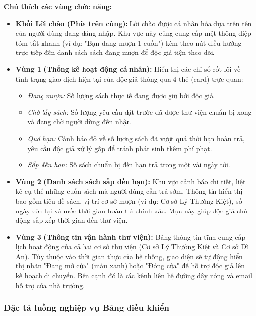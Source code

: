 \noindent\textbf{Chú thích các vùng chức năng:}
\begin{itemize}
    \item \textbf{Khối Lời chào (Phía trên cùng):} Lời chào được cá nhân hóa dựa trên tên của người dùng đang đăng nhập. Khu vực này cũng cung cấp một thông điệp tóm tắt nhanh (ví dụ: "Bạn đang mượn 1 cuốn") kèm theo nút điều hướng trực tiếp đến danh sách sách đang mượn để độc giả tiện theo dõi.
    
    \item \textbf{Vùng 1 (Thống kê hoạt động cá nhân):} Hiển thị các chỉ số cốt lõi về tình trạng giao dịch hiện tại của độc giả thông qua 4 thẻ (card) trực quan:
    \begin{itemize}
        \item \textit{Đang mượn:} Số lượng sách thực tế đang được giữ bởi độc giả.
        \item \textit{Chờ lấy sách:} Số lượng yêu cầu đặt trước đã được thư viện chuẩn bị xong và đang chờ người dùng đến nhận.
        \item \textit{Quá hạn:} Cảnh báo đỏ về số lượng sách đã vượt quá thời hạn hoàn trả, yêu cầu độc giả xử lý gấp để tránh phát sinh thêm phí phạt.
        \item \textit{Sắp đến hạn:} Số sách chuẩn bị đến hạn trả trong một vài ngày tới.
    \end{itemize}
    
    \item \textbf{Vùng 2 (Danh sách sách sắp đến hạn):} Khu vực cảnh báo chi tiết, liệt kê cụ thể những cuốn sách mà người dùng cần trả sớm. Thông tin hiển thị bao gồm tiêu đề sách, vị trí cơ sở mượn (ví dụ: Cơ sở Lý Thường Kiệt), số ngày còn lại và mốc thời gian hoàn trả chính xác. Mục này giúp độc giả chủ động sắp xếp thời gian đến thư viện.
    
    \item \textbf{Vùng 3 (Thông tin vận hành thư viện):} Bảng thông tin tĩnh cung cấp lịch hoạt động của cả hai cơ sở thư viện (Cơ sở Lý Thường Kiệt và Cơ sở Dĩ An). Tùy thuộc vào thời gian thực của hệ thống, giao diện sẽ tự động hiển thị nhãn "Đang mở cửa" (màu xanh) hoặc "Đóng cửa" để hỗ trợ độc giả lên kế hoạch di chuyển. Bên cạnh đó là các kênh liên hệ đường dây nóng và email hỗ trợ của nhà trường.
\end{itemize}

\vspace{0.5cm}
\subsubsection{Đặc tả luồng nghiệp vụ Bảng điều khiển}


